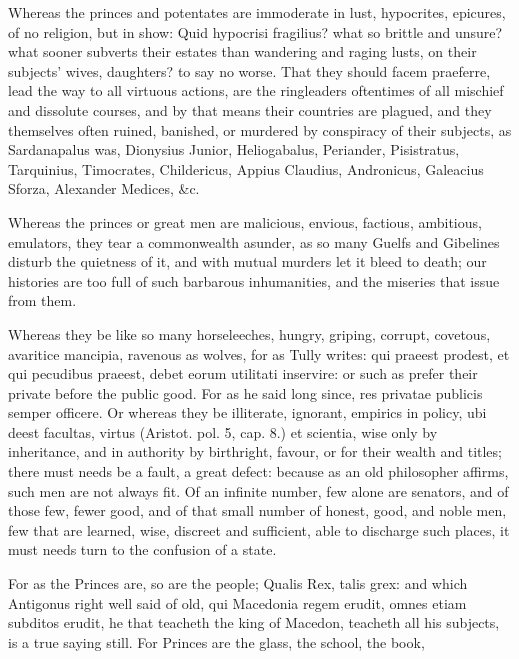 {Whereas the princes and potentates are immoderate in lust, hypocrites,
epicures, of no religion, but in show: Quid hypocrisi fragilius? what
so brittle and unsure? what sooner subverts their estates than
wandering and raging lusts, on their subjects' wives, daughters? to say
no worse. That they should facem praeferre, lead the way to all
virtuous actions, are the ringleaders oftentimes of all mischief and
dissolute courses, and by that means their countries are plagued,
and they themselves often ruined, banished, or murdered by
conspiracy of their subjects, as Sardanapalus was, Dionysius Junior,
Heliogabalus, Periander, Pisistratus, Tarquinius, Timocrates,
Childericus, Appius Claudius, Andronicus, Galeacius Sforza, Alexander
Medices, \&c.

Whereas the princes or great men are malicious, envious, factious,
ambitious, emulators, they tear a commonwealth asunder, as so many
Guelfs and Gibelines disturb the quietness of it, and with mutual
murders let it bleed to death; our histories are too full of such
barbarous inhumanities, and the miseries that issue from them.

Whereas they be like so many horseleeches, hungry, griping, corrupt,
 covetous, avaritice mancipia, ravenous as wolves, for as Tully
writes: qui praeest prodest, et qui pecudibus praeest, debet eorum
utilitati inservire: or such as prefer their private before the public
good. For as he said long since, res privatae publicis semper
officere. Or whereas they be illiterate, ignorant, empirics in policy,
ubi deest facultas, virtus (Aristot. pol. 5, cap. 8.) et scientia,
wise only by inheritance, and in authority by birthright, favour, or
for their wealth and titles; there must needs be a fault, a great
defect: because as an old philosopher affirms, such men are not
always fit. Of an infinite number, few alone are senators, and of those
few, fewer good, and of that small number of honest, good, and noble
men, few that are learned, wise, discreet and sufficient, able to
discharge such places, it must needs turn to the confusion of a state.

For as the Princes are, so are the people; Qualis Rex, talis grex:
and which Antigonus right well said of old, qui Macedonia regem
erudit, omnes etiam subditos erudit, he that teacheth the king of
Macedon, teacheth all his subjects, is a true saying still.
For Princes are the glass, the school, the book,

}
